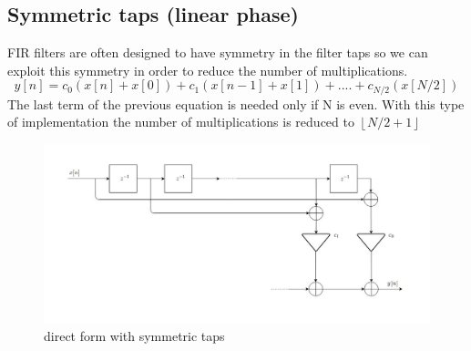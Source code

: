 \subsection{Symmetric taps (linear phase)}
FIR filters are often designed to have symmetry in the filter taps so we can  exploit this symmetry in order to reduce the number of multiplications.
$$y[n]= c_{0}(x[n]+x[0])+c_{1}(x[n-1]+x[1])+....+c_{N/2}(x[N/2])$$
The last term of the previous equation is needed only if N is even.
With this type of implementation the number of multiplications is reduced to $\left \lfloor N/2+1 \right \rfloor$
\begin{figure}[H]
    \centering
    \includegraphics[scale=0.45]{images/symmetryc.jpg}    
    \caption{direct form with symmetric taps}
    \label{fig:my_label}
\end{figure}
